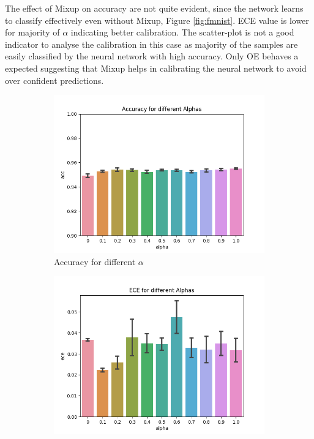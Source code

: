 The effect of Mixup on accuracy are not quite evident, since the network learns to classify effectively even without Mixup, Figure \ref{fig:fmnist}. ECE value is lower for majority of $\alpha$ indicating better calibration. The scatter-plot is not a good indicator to analyse the calibration in this case as majority of the samples are easily classified by the neural network with high accuracy. Only OE behaves a expected suggesting that Mixup helps in calibrating the neural network to avoid over confident predictions.    
\begin{figure}[h]
     \centering
     \begin{subfigure}[b]{0.31\textwidth}
         \centering
         \includegraphics[width=\textwidth]{images/fmnist/accuracyValpha.png}
         \caption{Accuracy for different $\alpha$}
     \end{subfigure}
     \begin{subfigure}[b]{0.31\textwidth}
         \centering
         \includegraphics[width=\textwidth]{images/fmnist/eceValpha.png}

\end{subfigure}
\end{figure}
